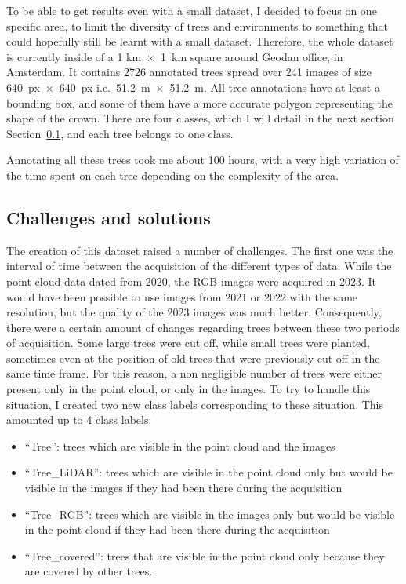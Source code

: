 \documentclass[
  letterpaper,
  DIV=11,
  numbers=noendperiod]{scrartcl}
\providecommand{\tightlist}{%
  \setlength{\itemsep}{0pt}\setlength{\parskip}{0pt}}\usepackage{longtable,booktabs,array}
\begin{document}
To be able to get results even with a small dataset, I decided to focus
on one specific area, to limit the diversity of trees and environments
to something that could hopefully still be learnt with a small dataset.
Therefore, the whole dataset is currently inside of a 1 km~×~1~km square
around Geodan office, in Amsterdam. It contains 2726 annotated trees
spread over 241 images of size 640~px~×~640~px i.e.~51.2~m~×~51.2~m. All
tree annotations have at least a bounding box, and some of them have a
more accurate polygon representing the shape of the crown. There are
four classes, which I will detail in the next section
Section~\ref{sec-dataset-challenges}, and each tree belongs to one
class.

Annotating all these trees took me about 100 hours, with a very high
variation of the time spent on each tree depending on the complexity of
the area.

\subsection{Challenges and solutions}\label{sec-dataset-challenges}

The creation of this dataset raised a number of challenges. The first
one was the interval of time between the acquisition of the different
types of data. While the point cloud data dated from 2020, the RGB
images were acquired in 2023. It would have been possible to use images
from 2021 or 2022 with the same resolution, but the quality of the 2023
images was much better. Consequently, there were a certain amount of
changes regarding trees between these two periods of acquisition. Some
large trees were cut off, while small trees were planted, sometimes even
at the position of old trees that were previously cut off in the same
time frame. For this reason, a non negligible number of trees were
either present only in the point cloud, or only in the images. To try to
handle this situation, I created two new class labels corresponding to
these situation. This amounted up to 4 class labels:

\begin{itemize}
\tightlist
\item
  ``Tree'': trees which are visible in the point cloud and the images
\item
  ``Tree\_LiDAR'': trees which are visible in the point cloud only but
  would be visible in the images if they had been there during the
  acquisition
\item
  ``Tree\_RGB'': trees which are visible in the images only but would be
  visible in the point cloud if they had been there during the
  acquisition
\item
  ``Tree\_covered'': trees that are visible in the point cloud only
  because they are covered by other trees.
\end{itemize}
\end{document}

